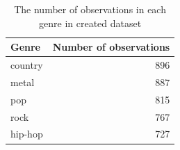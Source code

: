 \begin{table}[h]
\centering
\begin{tabular}{l|r}
\textbf{Genre} & \textbf{Number of observations} \\\hline
country & 896 \\
metal & 887 \\
pop & 815 \\
rock & 767 \\
hip-hop & 727 \\
\end{tabular}
\caption{The number of observations in each genre in created dataset}
\label{tab:our_dataset_genres}
\end{table}
